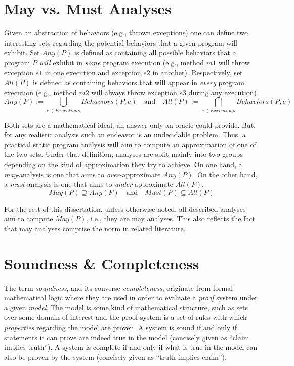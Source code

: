 \section{May vs. Must Analyses}
\label{sec:intro:may-must}

Given an abstraction of behaviors (e.g., thrown exceptions) one can define two interesting sets regarding the potential behaviors that a given program will exhibit. Set $Any(P)$ is defined as containing all possible behaviors that a program $P$ \emph{will} exhibit in \emph{some} program execution (e.g., method $m1$ will throw exception $e1$ in one execution and exception $e2$ in another). Respectively, set $All(P)$ is defined as containing behaviors that will appear in \emph{every} program execution (e.g., method $m2$ will always throw exception $e3$ during any execution).
\[
Any(P) := \bigcup_{e \in Executions} Behaviors(P, e)
\quad \textrm{and} \quad
All(P) := \bigcap_{e \in Executions} Behaviors(P, e)
\]

Both sets are a mathematical ideal, an answer only an oracle could provide. But, for any realistic analysis such an endeavor is an undecidable problem. Thus, a practical static program analysis will aim to compute an approximation of one of the two sets. Under that definition, analyses are split mainly into two groups depending on the kind of approximation they try to achieve. On one hand, a \emph{may}-analysis is one that aims to \emph{over}-approximate $Any(P)$. On the other hand, a \emph{must}-analysis is one that aims to \emph{under}-approximate $All(P)$.
\[
May(P) \supseteq Any(P) \quad \textrm{and} \quad Must(P) \subseteq All(P)
\]

For the rest of this dissertation, unless otherwise noted, all described analyses aim to compute $May(P)$, i.e., they are may analyses. This also reflects the fact that may analyses comprise the norm in related literature.


\section{Soundness \& Completeness}
\label{sec:intro:soundness}

The term \emph{soundness}, and its converse \emph{completeness}, originate from formal mathematical logic where they are used in order to evaluate a \emph{proof} system under a given \emph{model}. The model is some kind of mathematical structure, such as sets over some domain of interest and the proof system is a set of rules with which \emph{properties} regarding the model are proven. A system is sound if and only if statements it can prove are indeed true in the model (concisely given as ``claim implies truth''). A system is complete if and only if what is true in the model can also be proven by the system (concisely given as ``truth implies claim'').

